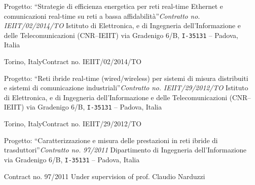 
{\newline Progetto: ``Strategie di efficienza energetica per reti real-time Ethernet e comunicazioni real-time su reti a bassa affidabilità''}{\emph{Contratto no. IEIIT/02/2014/TO}}
{Istituto di Elettronica, e di Ingegneria dell'Informazione e delle Telecomunicazioni (CNR--IEIIT)\newline 
via Gradenigo 6/B,  \texttt{I-35131} -- Padova, Italia}

{Torino, Italy}{\newline Contract no. IEIIT/02/2014/TO}
{}%

{\newline Progetto: ``Reti ibride real-time (wired/wireless) per sistemi di misura distribuiti e sistemi di
comunicazione industriali''}{\emph{Contratto no. IEIIT/29/2012/TO}}
{Istituto di Elettronica, e di Ingegneria dell'Informazione e delle Telecomunicazioni (CNR--IEIIT)\newline
via Gradenigo 6/B,  \texttt{I-35131} -- Padova, Italia}

{Torino, Italy}{\newline Contract no. IEIIT/29/2012/TO}{}

{\newline Progetto: ``Caratterizzazione e misura delle prestazioni in reti ibride di trasduttori''}{\emph{Contratto no. 97/2011}}
{Dipartimento di Ingegneria dell'Informazione\newline
via Gradenigo 6/B, \texttt{I-35131} -- Padova, Italia}

{\newline Contract no. 97/2011}{}
{Under supervision of prof. Claudio Narduzzi}%